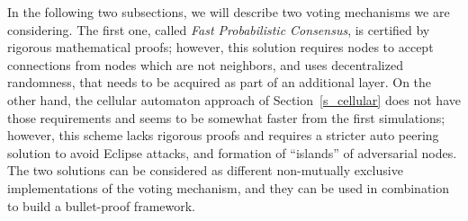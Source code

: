 \documentclass[../main.tex]{subfiles}
\begin{document}
In the following two subsections, we will describe two voting mechanisms we are considering.
The first one, called \emph{Fast Probabilistic Consensus}, is certified by rigorous mathematical proofs; however, this solution requires nodes to accept connections from nodes which are not neighbors, and uses decentralized randomness, that needs to be acquired as part of an additional layer.
On the other hand, the cellular automaton approach of Section~\ref{s_cellular} does not have those requirements and seems to be somewhat faster from the first simulations; however, this scheme lacks rigorous proofs and requires a stricter auto peering solution to avoid Eclipse attacks, and formation of \enquote{islands} of adversarial nodes.
The two solutions can be considered as different non-mutually exclusive implementations of the voting mechanism, and they can be used in combination to build a bullet-proof framework.
\end{document}
